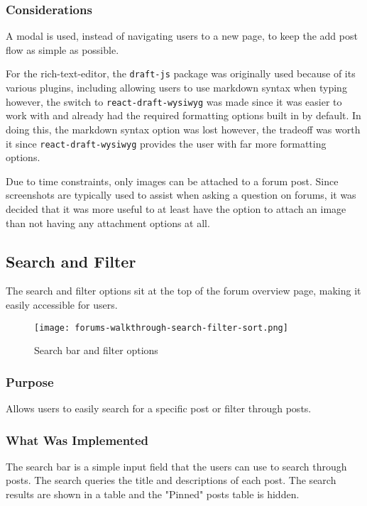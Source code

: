 \subsubsection{Considerations}
A modal is used, instead of navigating users to a new page, to keep the add post flow as simple as possible.

For the rich-text-editor, the \texttt{draft-js} package was originally used because of its various plugins, including allowing users to use markdown syntax when typing
however, the switch to \texttt{react-draft-wysiwyg} was made since it was easier to work with and already had the required formatting options built in by default.
In doing this, the markdown syntax option was lost however, the tradeoff was worth it since \texttt{react-draft-wysiwyg} provides the user with far more formatting options.

Due to time constraints, only images can be attached to a forum post.
Since screenshots are typically used to assist when asking a question on forums, it was decided that it was more useful to at least have the option to attach an image than not having any attachment options at all.

\subsection{Search and Filter}
The search and filter options sit at the top of the forum overview page, making it easily accessible for users.

\newpage

\begin{figure}[h!]
    \texttt{[image: forums-walkthrough-search-filter-sort.png]}
    \centering
    \caption{Search bar and filter options}
\end{figure}

\subsubsection{Purpose}
Allows users to easily search for a specific post or filter through posts.

\subsubsection{What Was Implemented}
The search bar is a simple input field that the users can use to search through posts.
The search queries the title and descriptions of each post.
The search results are shown in a table and the "Pinned" posts table is hidden.

